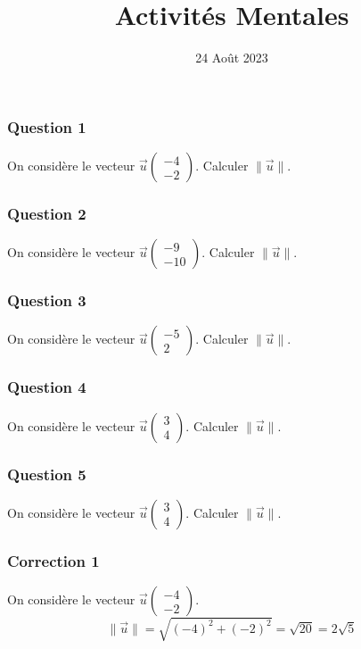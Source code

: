 \documentclass[15pt, mathserif]{beamer}
\title{Activités Mentales}
\date{24 Août 2023}
\begin{document}
\begin{frame}
    \titlepage
\end{frame}

\begin{frame} 
	\frametitle{Question 1}
On considère le vecteur $\vec{u} \begin{pmatrix} -4 \\ -2 \end{pmatrix}$. Calculer $\|\vec{u}\|$.\end{frame}


\begin{frame} 
	\frametitle{Question 2}
On considère le vecteur $\vec{u} \begin{pmatrix} -9 \\ -10 \end{pmatrix}$. Calculer $\|\vec{u}\|$.\end{frame}


\begin{frame} 
	\frametitle{Question 3}
On considère le vecteur $\vec{u} \begin{pmatrix} -5 \\ 2 \end{pmatrix}$. Calculer $\|\vec{u}\|$.\end{frame}


\begin{frame} 
	\frametitle{Question 4}
On considère le vecteur $\vec{u} \begin{pmatrix} 3 \\ 4 \end{pmatrix}$. Calculer $\|\vec{u}\|$.\end{frame}


\begin{frame} 
	\frametitle{Question 5}
On considère le vecteur $\vec{u} \begin{pmatrix} 3 \\ 4 \end{pmatrix}$. Calculer $\|\vec{u}\|$.\end{frame}


\begin{frame}
\vspace{-10mm}
	\frametitle{Correction 1}
On considère le vecteur $\vec{u} \begin{pmatrix} -4 \\ -2 \end{pmatrix}$. $$\|\vec{u}\|=\sqrt{\left(-4\right)^2+\left(-2\right)^2}=\sqrt{20}=2\sqrt{5}$$\end{frame}
\end{document}
